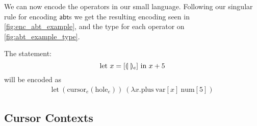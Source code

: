 \documentclass[sigplan]{acmart}
\newcommand{\abt}{\textsf{abt}\xspace}
\begin{document}
\begin{example}\label{ex:enc_abt_example}
    We can now encode the operators in our small language. Following
    our singular rule for encoding $\abt$s we get the resulting encoding
    seen in \cref{fig:enc_abt_example}, and the type for each operator
    on \cref{fig:abt_example_type}.



\end{example}
%
The statement:
\begin{equation*}
        \text{let $x=[\llparenthesis \ \rrparenthesis_e]$ in $x+5$}
    \end{equation*}
will be encoded as
    \begin{align*}
        \text{let} \ (\text{cursor}_e(\text{hole}_e)) \ (\lambda x . \text{plus} \ \text{var}[x] \ \text{num}[5])
  \end{align*}




\subsection{Cursor Contexts}\label{sec:enc_cursor_contexts}
\end{document}
